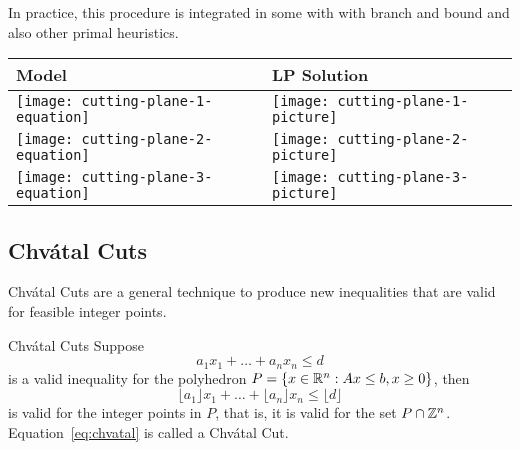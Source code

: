\documentclass[../open-optimization/open-optimization.tex]{subfiles}
\begin{document}
In practice, this procedure is integrated in some with with branch and bound and also other primal heuristics.


\begin{table}[h]
\centering\begin{tabular}{>{\centering\arraybackslash}m{5cm}>{\centering\arraybackslash}m{10cm}}
 \hline
\textbf{Model} & \textbf{LP Solution} \\\hline \hline
 \texttt{[image: cutting-plane-1-equation]} &
\texttt{[image: cutting-plane-1-picture]}\\
\texttt{[image: cutting-plane-2-equation]} &
\texttt{[image: cutting-plane-2-picture]}\\
\texttt{[image: cutting-plane-3-equation]} &
\texttt{[image: cutting-plane-3-picture]}\\
\hline
 \end{tabular}
\end{table}


\subsection{Chv\'atal Cuts}


Chv\'atal Cuts are a general technique to produce new inequalities that are valid for feasible integer points.  


\begin{general}{Chv\'atal Cuts}{}
Suppose 
\begin{equation}
a_1 x_1 + \dots + a_n x_n \leq d
\end{equation}
is a valid inequality for the polyhedron $P = \{ x \in {\mathbb{R}}^n : Ax \leq b, x \geq 0\}$, then 
\begin{equation}
\label{eq:chvatal}
\lfloor a_1\rfloor x_1 + \dots + \lfloor a_n\rfloor  x_n \leq \lfloor d\rfloor
\end{equation}
is valid for the integer points in $P$, that is, it is valid for the set $P \cap {\mathbb{Z}}^n$.  Equation~\eqref{eq:chvatal} is called a Chv\'atal Cut.
\end{general}
\end{document}
